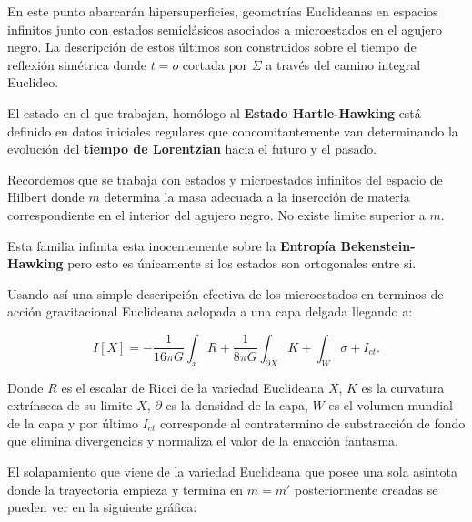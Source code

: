\documentclass[letterpaper]{article}
\begin{document}
\begin{justify}
En este punto abarcarán  hipersuperficies, geometrías Euclideanas en espacios infinitos junto con estados semiclásicos asociados a microestados en el agujero negro. La descripción de estos últimos son construidos sobre el tiempo de reflexión simétrica
donde \(t=o\) cortada por \(\Sigma\) a través del camino integral Euclideo.
\end{justify}
\begin{justify}
El estado en el que trabajan, homólogo al \textbf{Estado Hartle-Hawking} está definido en datos iniciales regulares que concomitantemente van determinando la evolución del \textbf{tiempo de Lorentzian} hacia el futuro
y el pasado. 
\end{justify}
\begin{justify}
Recordemos que se trabaja con estados y microestados infinitos del espacio de Hilbert donde \(m\) determina la masa adecuada a la insercción de materia correspondiente en el interior del agujero negro. No existe limite superior a \(m\).
\end{justify}
\begin{justify}
Esta familia infinita esta inocentemente sobre la \textbf{Entropía Bekenstein-Hawking} pero esto es únicamente si los estados son ortogonales entre si. 
\end{justify}
\begin{justify}
Usando así una simple descripción efectiva de los microestados en terminos de acción gravitacional Euclideana aclopada a una capa delgada llegando a:
\end{justify}
\begin{justify}
\[I[X]=-\frac{1}{16\pi G} \int_{x}^{} R+\frac{1}{8\pi G}\int_{\partial X}^{}K+\int_{W}^{}\sigma+I_{ct}. \]
\end{justify}
\begin{justify}
Donde \(R\) es el escalar de Ricci de la variedad Euclideana \(X\), \(K\) es la curvatura extrínseca de su limite \(X\), \(\partial\) es la densidad de la capa, \(W\) es el volumen  mundial de la capa y por último \(I_{ct}\) corresponde
al contratermino de substracción de fondo que elimina divergencias y normaliza el valor de la enacción fantasma.
\end{justify}
\begin{justify}
El solapamiento que viene de la variedad Euclideana que posee una sola asintota donde la trayectoria empieza y termina en \(m=m'\) posteriormente creadas se pueden ver en la siguiente gráfica:
\end{justify}
\end{document}

